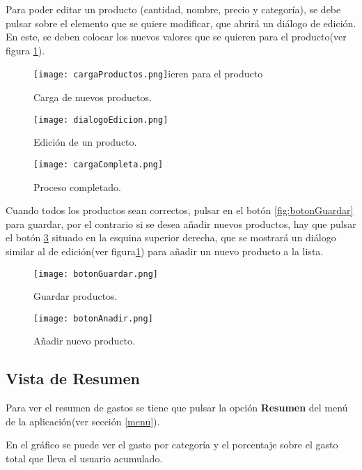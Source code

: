 Para poder editar un producto (cantidad, nombre, precio y categoría), se debe pulsar sobre el elemento que se quiere modificar, que abrirá un diálogo de edición. En este, se deben colocar los nuevos valores que se quieren para el producto(ver figura \ref{fig:dialogoEdicion}).

\begin{figure}[ht]
  \texttt{[image: cargaProductos.png]}ieren para el producto
  \caption{Carga de nuevos productos.}\label{fig:cargaProductos}
\endminipage\hfill
{}
  \texttt{[image: dialogoEdicion.png]}
  \caption{Edición de un producto.}\label{fig:dialogoEdicion}
\endminipage
\end{figure}
\begin{figure}[ht]
\begin{center}
%
  \texttt{[image: cargaCompleta.png]}
  \caption{Proceso completado.}\label{fig:cargaCompleta}
\endminipage
\end{center} 
\end{figure}
\cleardoublepage
Cuando todos los productos sean correctos, pulsar en el botón \ref{fig:botonGuardar} para guardar, por el contrario si se desea añadir nuevos productos, hay que pulsar el botón \ref{fig:botonAnadir} situado en la esquina superior derecha, que se mostrará un diálogo similar al de edición(ver figura\ref{fig:dialogoEdicion}) para añadir un nuevo producto a la lista.

\begin{figure}[ht]
\begin{center} 
  \texttt{[image: botonGuardar.png]}
  \caption{Guardar productos.}\label{fig:botonGuardar}
\endminipage\hfil
{}
  \texttt{[image: botonAnadir.png]}
  \caption{Añadir nuevo producto.}\label{fig:botonAnadir}
\endminipage
\end{center}
\end{figure}

\subsection{Vista de Resumen \label{resumen}}

Para ver el resumen de gastos se tiene  que pulsar la opción \textbf{Resumen} del menú de la aplicación(ver sección \ref{menu}).

En el gráfico se puede ver el gasto por categoría y el porcentaje sobre el gasto total que lleva el usuario acumulado.

